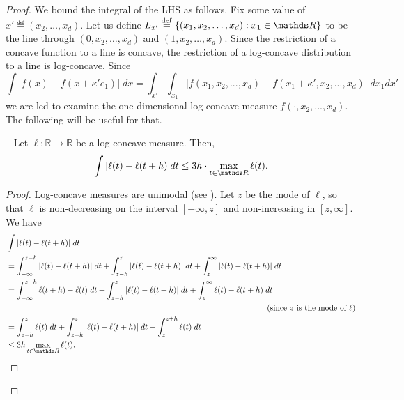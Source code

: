 \begin{proof}
We bound the integral of the LHS as follows.  Fix some value of $x' \eqdef (x_2, \ldots, x_d)$. 
Let us define $L_{x'} \eqdef \{ (x_1, x_2, \ldots, x_d) : x_1 \in \R \}$
to be the line through $(0,x_2, \ldots, x_d)$ and $(1,x_2, \ldots, x_d)$.
Since the restriction of a concave function to a line is concave, the
restriction of a log-concave distribution to a line is log-concave.  Since
\begin{equation}
\label{e:reduce.to.1d}
\int |f(x) - f(x + \kappa' e_1)|\; dx
 = \int_{x'} \int_{x_1} |f(x_1,x_2,...,x_d) - f(x_1 + \kappa', x_2,...,x_d)| \; dx_1 dx'
\end{equation}
we are led to examine the one-dimensional log-concave measure
$f(\cdot,x_2,...,x_d)$.
The following will be useful for that.
\begin{claim}~\label{clm:integral}
Let $\ell: \mathbb{R} \rightarrow \mathbb{R}$ be a log-concave measure. Then, $$\int |\ell(t) - \ell(t+h) | dt \le 3h \cdot \max_{t \in \R} \ell(t).$$
\end{claim}
\begin{proof}
Log-concave measures are unimodal (see \citep{ibragimov1956composition}).
Let $z$ be the mode of $\ell$, so that $\ell$ is non-decreasing 
on the interval $[-\infty,z]$ and non-increasing in $[z,\infty]$. 
We have
\begin{align*}
& \int |\ell(t) - \ell(t+h) | \; dt \\
& = \int_{-\infty}^{z-h} |\ell(t) - \ell(t+h) | \; dt 
       + \int_{z-h}^{z} |\ell(t) - \ell(t+h) | \; dt 
       + \int_{z}^{\infty} |\ell(t) - \ell(t+h) | \; dt \\
& = \int_{-\infty}^{z-h} \ell(t+h) - \ell(t) \; dt 
       + \int_{z-h}^{z} |\ell(t) - \ell(t+h) | \; dt 
       + \int_{z}^{\infty} \ell(t) - \ell(t+h) \; dt \\
& \hspace{4.5in} \mbox{(since $z$ is the mode of $\ell$)} \\
& = \int_{z-h}^{z} \ell(t) \; dt 
       + \int_{z-h}^{z} |\ell(t) - \ell(t+h) | \; dt 
       + \int_{z}^{z+h} \ell(t) \; dt \\
& \leq 3 h \max_{t \in \R} \ell(t).
\end{align*}
\end{proof}


\end{proof}
